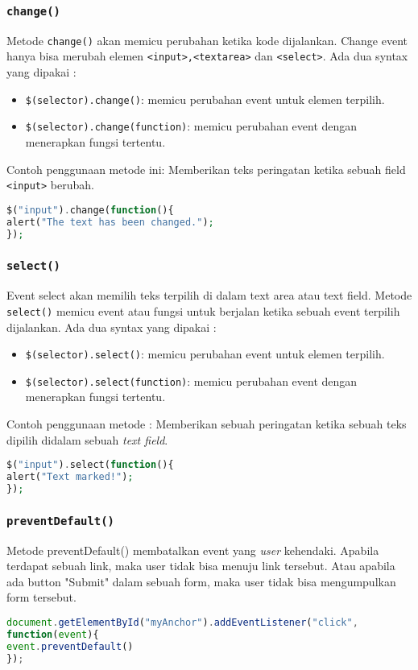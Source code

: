 \subsubsection{\texttt{change()}}
Metode \texttt{change()} akan memicu perubahan ketika kode dijalankan. Change event hanya bisa merubah elemen \texttt{<input>,<textarea>} dan \texttt{<select>}.
Ada dua syntax yang dipakai :
\begin{itemize}
	\item \texttt{\$(selector).change()}: memicu perubahan event untuk elemen terpilih.
	\item \texttt{\$(selector).change(function)}: memicu perubahan event dengan menerapkan fungsi tertentu.
\end{itemize}
Contoh penggunaan metode ini: Memberikan teks peringatan ketika sebuah field \texttt{<input>} berubah.
\begin{lstlisting}[frame=single, language=PHP, label={lst:jQueryChange}, caption=jQuery change().]
$("input").change(function(){
alert("The text has been changed.");
});
\end{lstlisting}

\subsubsection{\texttt{select()}}
Event select akan memilih teks terpilih di dalam text area atau text field.
Metode \texttt{select()} memicu event atau fungsi untuk berjalan ketika sebuah event terpilih dijalankan.
Ada dua syntax yang dipakai :
\begin{itemize}
	\item \texttt{\$(selector).select()}: memicu perubahan event untuk elemen terpilih.
	\item \texttt{\$(selector).select(function)}: memicu perubahan event dengan menerapkan fungsi tertentu.
\end{itemize}
Contoh penggunaan metode : Memberikan sebuah peringatan ketika sebuah teks dipilih didalam sebuah \textit{text field}.
\begin{lstlisting}[frame=single, language=PHP, label={lst:jQuerySelect}, caption=jQuery Selector.]
$("input").select(function(){
alert("Text marked!");
});
\end{lstlisting}

\subsubsection{\texttt{preventDefault()}}
Metode preventDefault() membatalkan event yang \textit{user} kehendaki. Apabila terdapat sebuah link, maka user tidak bisa menuju link tersebut. Atau apabila ada button "Submit" dalam sebuah form, maka user tidak bisa mengumpulkan form tersebut.
\begin{lstlisting}[frame=single, language=javascript, label={lst:jQuerypreventDefault}, caption=jQuery preventDefault().]
document.getElementById("myAnchor").addEventListener("click", 
function(event){
event.preventDefault()
});
\end{lstlisting}


